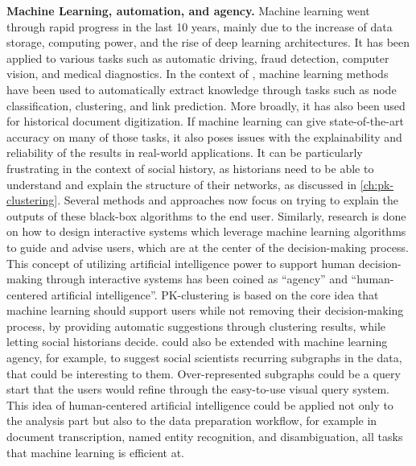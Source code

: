 \noindent\textbf{Machine Learning, automation, and agency.} Machine learning went through rapid progress in the last 10 years, mainly due to the increase of data storage, computing power, and the rise of deep learning architectures.
It has been applied to various tasks such as automatic driving, fraud detection, computer vision, and medical diagnostics.
In the context of \sna, machine learning methods have been used to automatically extract knowledge through tasks such as node classification, clustering, and link prediction\cite{michalskiPredictingSocialNetwork2012}.
More broadly, it has also been used for historical document digitization\cite{philipsHistoricalDocumentProcessing2020}.
If machine learning can give state-of-the-art accuracy on many of those tasks, it also poses issues with the explainability and reliability of the results in real-world applications.
It can be particularly frustrating in the context of social history, as historians need to be able to understand and explain the structure of their networks, as discussed in \autoref{ch:pk-clustering}.
Several methods and approaches now focus on trying to explain the outputs of these black-box algorithms to the end user\cite{holzingerMachineLearningExplainable2018}.
Similarly, research is done on how to design interactive systems which leverage machine learning algorithms to guide and advise users, which are at the center of the decision-making process.
This concept of utilizing artificial intelligence power to support human decision-making through interactive systems has been coined as ``agency''\cite{heerAgencyAutomationDesigning2019} and ``human-centered artificial intelligence''\cite{shneidermanHumanCenteredAI2022}.
PK-clustering is based on the core idea that machine learning should support users while not removing their decision-making process, by providing automatic suggestions through clustering results, while letting social historians decide.
\name could also be extended with machine learning agency, for example, to suggest social scientists recurring subgraphs in the data, that could be interesting to them.
Over-represented subgraphs could be a query start that the users would refine through the easy-to-use visual query system.
This idea of human-centered artificial intelligence could be applied not only to the analysis part but also to the data preparation workflow, for example in document transcription, named entity recognition, and disambiguation, all tasks that machine learning is efficient at.

